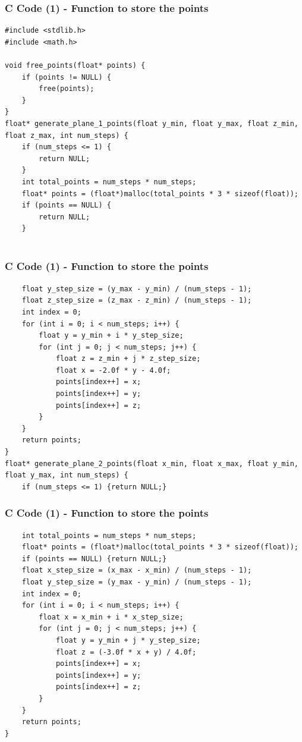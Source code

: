 \documentclass{beamer}
\begin{document}
\begin{frame}[fragile]
    \frametitle{C Code (1) - Function to store the points }

    \begin{lstlisting}
#include <stdlib.h>
#include <math.h>

void free_points(float* points) {
    if (points != NULL) {
        free(points);
    }
}
float* generate_plane_1_points(float y_min, float y_max, float z_min, float z_max, int num_steps) {
    if (num_steps <= 1) {
        return NULL;
    }
    int total_points = num_steps * num_steps;
    float* points = (float*)malloc(total_points * 3 * sizeof(float));
    if (points == NULL) {
        return NULL;
    }


    \end{lstlisting}
\end{frame}
\begin{frame}[fragile]
    \frametitle{C Code (1) - Function to store the points }

    \begin{lstlisting}
    float y_step_size = (y_max - y_min) / (num_steps - 1);
    float z_step_size = (z_max - z_min) / (num_steps - 1);
    int index = 0;
    for (int i = 0; i < num_steps; i++) {
        float y = y_min + i * y_step_size;
        for (int j = 0; j < num_steps; j++) {
            float z = z_min + j * z_step_size;
            float x = -2.0f * y - 4.0f;
            points[index++] = x;
            points[index++] = y;
            points[index++] = z;
        }
    }
    return points;
}
float* generate_plane_2_points(float x_min, float x_max, float y_min, float y_max, int num_steps) {
    if (num_steps <= 1) {return NULL;}
    \end{lstlisting}
\end{frame}
\begin{frame}[fragile]
    \frametitle{C Code (1) - Function to store the points }

    \begin{lstlisting}
    int total_points = num_steps * num_steps;
    float* points = (float*)malloc(total_points * 3 * sizeof(float));
    if (points == NULL) {return NULL;}
    float x_step_size = (x_max - x_min) / (num_steps - 1);
    float y_step_size = (y_max - y_min) / (num_steps - 1);
    int index = 0;
    for (int i = 0; i < num_steps; i++) {
        float x = x_min + i * x_step_size;
        for (int j = 0; j < num_steps; j++) {
            float y = y_min + j * y_step_size;
            float z = (-3.0f * x + y) / 4.0f;
            points[index++] = x;
            points[index++] = y;
            points[index++] = z;
        }
    }
    return points;
}
    \end{lstlisting}
\end{frame}
\end{document}
